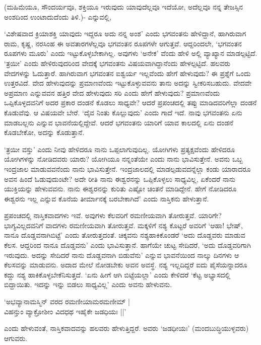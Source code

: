 (ಮಹಿಮೆಯೂ, ಸೌಂದರ್ಯವೂ, ಶಕ್ತಿಯೂ ಇರುವುದು ಯಾವುದೆಲ್ಲವೂ ಇದೆಯೋ, ಅದೆಲ್ಲವೂ ನನ್ನ ತೇಜಸ್ಸಿನ ಅಂಶದಿಂದ ಉಂಟಾದುದೆಂದು ತಿಳಿ.)- ಎನ್ನುವಲ್ಲಿ,

`ವಿಶೇಷವಾದ ಕ್ರಿಯಾಶಕ್ತಿ ಯಾವುದು ಇದ್ದರೂ ಅದು ನನ್ನ ಅಂಶ' ಎಂದು ಭಗವಂತನು ಹೇಳಿದ್ದಾನೆ, ಹಾಗಿರುವಾಗ ರಾಮ, ಕೃಷ್ಣ, ನರಸಿಂಹ ಈ ಅವತಾರಗಳೆಲ್ಲವೂ ಭಗವಂತನ ರೂಪಗಳೇ ಆಗುತ್ತವೆ. ಆದ್ದರಿಂದಲೇ, `ಭಗವಂತನ ರೂಪಗಳು ಮೂರು' ಎಂದು ಇಟ್ಟುಕೊಳ್ಳಬೇಕಾಗಿಲ್ಲ. ಅವುಗಳು `ಅನೇಕ' ವೆಂದು ಹೇಳಿ ಅಲ್ಲಿ ವ್ಯಾಖ್ಯಾನ ಮಾಡಲ್ಪಟ್ಟಿದೆ. `ತ್ರಯೀ' ಎಂದು ಹೇಳಿರುವುದರಿಂದ ವೇದಕ್ಕೆ ಭಗವಂತನು ವಿಷಯವಾಗಿದ್ದಾನೆಂದು ಹೇಳಲ್ಪಟ್ಟಿದೆ. ಹಲವರು ವೇದಗಳನ್ನು ಓದುತ್ತಾರೆ. ಹಾಗಿರುವಾಗ ಭಗವಂತನ ಐಶ್ವರ್ಯ ಇಲ್ಲವೆಂದು ಹೇಗೆ ಹೇಳುವುದು? ಈ ಪ್ರಶ್ನೆಗೆ ಒಂದು ಉತ್ತರವಿದೆ. ವೇದ ಹೇಳುವುದನ್ನು ಪ್ರಮಾಣವೆಂದು ಇಟ್ಟುಕೊಳ್ಳುವವನು ತಾನು ಅದನ್ನು  ಸ್ವೀಕರಿಸಬಹುದು. ವೇದವೇ ಅಪ್ರಮಾಣ ಎನ್ನುವವನ ಹತ್ತಿರ ವೇದ ಹೇಳುವುದು ಸರಿ ಎಂದು ಹೇಗೆ ಹೇಳುವುದು? ಪ್ರಮಾಣವೆಂದು ಒಪ್ಪಿಕೊಳ್ಳದವನಿಗೆ ಅದರ ಪ್ರಕಾರ ದಂಡನೆ ಕೊಡಲು ಸಾಧ್ಯವೇ? ಆದರೆ ಪ್ರಪಂಚದಲ್ಲಿ ತಪ್ಪು ಮಾಡಿದವರಿಗೆಲ್ಲಾ ದಂಡನೆ ಕೊಡುವೆವು. ಆ ವಿಷಯವೇ ಬೇರೆ. `ದೈವ ನಿಂತು ಕೊಲ್ಲುವುದು' ಎಂದು ಗಾದೆ ಇದೆ. ನಾವು ಭಗವಂತನು ಏನು ಮಾಡಬಲ್ಲನು ಎನ್ನುವ ಭಾವನೆಯಲ್ಲಿದ್ದೇವೆ. ಆದರೆ ಭಗವಂತನು ಯಾರಿಗೆ ಯಾವ ಕಾಲದಲ್ಲಿ ಏನು ದಂಡನೆ ಕೊಡಬೇಕೋ, ಅದನ್ನು ಕೊಡುತ್ತಾನೆ.

`ತ್ರಯೀ ವಸ್ತು' ಎಂದು ನೀವು ಹೇಳಿದರೂ ನಾನು ಒಪ್ಪಲಾಗುವುದಿಲ್ಲ. ಯೋಗಿಗಳು ಪ್ರತ್ಯಕ್ಷವೆಂದು ಹೇಳಿದರೂ ಯೋಗಿಗಳನ್ನು ನೋಡಿದವರು ಯಾರು? ಯೋಗಿಯೂ ನನ್ನಂತೆಯೇ ಎಂದು ನಾನು ಭಾವಿಸುತ್ತೇನೆ. ಅವನು ಒಬ್ಬ ಇಂದ್ರಜಾಲ ಮಾಡುವವನೆಂದು ನಾನು ಭಾವಿಸುತ್ತೇನೆ. ಇಂದ್ರಜಾಲದಲ್ಲಿ ಮಾಡಲ್ಪಡುವದನ್ನೆಲ್ಲಾ ಕಂಡು ಯಾರಾದರೂ ಅವನ ಹಿಂದೆ ಓಡುವುದುಂಟೇ? ಅದೇ ರೀತಿ ನಾನು ಈಶ್ವರನನ್ನು ಒಪ್ಪಿಕೊಳ್ಳಲು ಸಾಧ್ಯವಿಲ್ಲ, ಏಕೆಂದರೆ ನಾನು ಯುಕ್ತಿಯನ್ನು ಹೇಳುವವನು. ನಾನು ಈಶ್ವರನನ್ನು ಕುರಿತು ಎಷ್ಟೋ ಚಿಂತನೆ ಮಾಡಿದ್ದೇನೆ. ಹೇಗೆ ನೋಡಿದರೂ ಈಶ್ವರನು ಇಲ್ಲ ಎನ್ನುವ ಕೊನೆಯ ತೀರ್ಮಾನಕ್ಕೆ ಬರಬೇಕಾಗಿದೆ' ಎಂದು ನಾಸ್ತಿಕನು ಹೇಳುತ್ತಾನೆ.

ಪ್ರಪಂಚದಲ್ಲಿ ನಾಸ್ತಿಕವಾದಗಳು ಇವೆ. ಅವುಗಳು ಕೆಲವರಿಗೆ ರಮಣೀಯವಾಗಿ ತೋರುತ್ತವೆ. ಯಾರಿಗೇ? ಭಾಗ್ಯವಿಲ್ಲದವನಿಗೆ ವಾದಗಳು ರಮಣೀಯವಾಗಿ ತೋರುತ್ತವೆ. ಮಕ್ಕಳಿಗೆ ನಶ್ಯ ಕೊಟ್ಟರೆ ಅವರಿಗೆ `ಆಹಾ! ಭೇಷ್, ನಾನೂ ದೊಡ್ಡವನಾಗಿಬಿಟ್ಟೆ' ಎಂದು ತೋರುತ್ತದಂತೆ. ಚಿಕ್ಕವನು ನಶ್ಯಹಾಕಿಕೊಂಡರೆ `ಅದು ದೊಡ್ಡವರು ಮಾಡುವ ಕೆಲಸ. ಆದ್ದರಿಂದ ನಾನೂ ದೊಡ್ಡವನು' ಎಂದು ಭಾವಿಸುತ್ತಾನೆ. ಹಾಗೆಯೇ ಚುಟ್ಟ ಸೇದಿದರೆ, `ಅದು ದೊಡ್ಡವರಿಗಾಗಿ ಇರುವುದು. ಅದನ್ನು ಸೇದಿದರೆ ನಾನು ದೊಡ್ಡವನಾಗಿ ಬಿಡುವೆನು' ಎನ್ನುವ ಭಾವನೆಯಿಂದ ನಾಲ್ಕು ದಿನಗಳು ಆ ಕೆಲಸವನ್ನು ಮಾಡುವನು. ಅದಾದ ಮೇಲೆ ನೋಡಬೇಕು ಅವನ ಅವಸ್ಥೆ. ನಶ್ಯ ಇಲ್ಲದಿದ್ದರೆ ಐದು ಪೈಸೆಯನ್ನಾದರೂ ಕದ್ದು ನಶ್ಯ ಹಾಕಿಕೊಳ್ಳಬೇಕೆನಿಸುತ್ತದೆ. `ಏನು ಹೀಗೆ ಆಗಿ ಬಿಟ್ಟೆಯಲ್ಲಾ' ಎಂದು ಕೇಳಿದರೆ `ಕೆಟ್ಟ ಅಭ್ಯಾಸದಲ್ಲಿ ಬಿದ್ದಾಯಿತು. ಇದನ್ನು ಇನ್ನು ಬಿಡಲು ಸಾಧ್ಯವಿಲ್ಲ' ಎಂದು ಅವನು ಹೇಳುವನು.

\begin{shloka}
`ಅಭವ್ಯಾನಾಮಸ್ಮಿನ್ ವರದ ರಮಣೀಯಾಮರಮಣೀಮ್ |\\
ವಿಹನ್ತುಂ ವ್ಯಾಕ್ರೋಶೀಂ ವಿದಧಥ ಇಹೈಕೇ ಜಡಧಿಯಃ ||'
\end{shloka}

ಎಂದು ಹೇಳುವಂತೆ, ನಾಸ್ತಿಕವಾದವನ್ನು ಹಲವರು ಹೇಳುತ್ತಿದ್ದರೆ. ಅವರು `ಜಡಧೀಯಃ' (ಮಂದಬುದ್ಧಿಯುಳ್ಳವರು) ಆಗುವರು.

